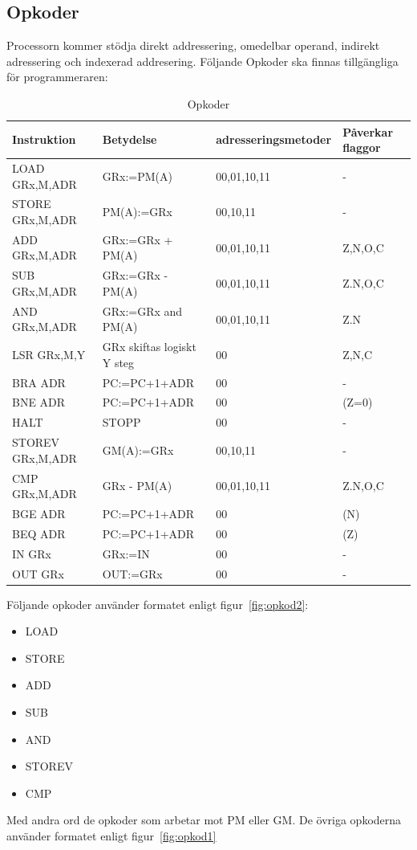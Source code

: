 \subsection{Opkoder}
Processorn kommer stödja direkt addressering, omedelbar operand, indirekt adressering och indexerad addresering.
Följande Opkoder ska finnas tillgängliga för programmeraren:
\begin{table}[H]
  \centering
  \begin{tabular}{|l|l|l|l|}
    \hline
    \textbf{Instruktion} & \textbf{Betydelse} & \textbf{adresseringsmetoder} & \textbf{Påverkar flaggor} \\ \hline
  LOAD GRx,M,ADR & GRx:=PM(A) & 00,01,10,11 & - \\ \hline
   STORE GRx,M,ADR & PM(A):=GRx & 00,10,11 & - \\ \hline
    ADD GRx,M,ADR & GRx:=GRx + PM(A) & 00,01,10,11 & Z,N,O,C \\ \hline
     SUB GRx,M,ADR & GRx:=GRx - PM(A) & 00,01,10,11 & Z.N,O,C \\ \hline
      AND GRx,M,ADR & GRx:=GRx and PM(A) & 00,01,10,11 & Z.N \\ \hline
       LSR GRx,M,Y & GRx skiftas logiskt Y steg & 00 & Z,N,C \\ \hline
        BRA ADR & PC:=PC+1+ADR & 00 & - \\ \hline
         BNE ADR & PC:=PC+1+ADR & 00 & (Z=0) \\ \hline
          HALT  & STOPP & 00 & - \\ \hline
          STOREV GRx,M,ADR & GM(A):=GRx & 00,10,11 & - \\ \hline
     		CMP GRx,M,ADR & GRx - PM(A) & 00,01,10,11 & Z.N,O,C \\ \hline
     		BGE ADR & PC:=PC+1+ADR & 00 & (N) \\ \hline
     		BEQ ADR & PC:=PC+1+ADR & 00 & (Z) \\ \hline
     		IN GRx & GRx:=IN & 00 & - \\ \hline
     		OUT GRx & OUT:=GRx & 00 & - \\ \hline
  \end{tabular}
  \caption{Opkoder}

\end{table}

Följande opkoder använder formatet enligt figur~\ref{fig:opkod2}:
\begin{itemize}
\item LOAD
\item STORE
\item ADD
\item SUB
\item AND
\item STOREV
\item CMP
\end{itemize}
Med andra ord de opkoder som arbetar mot PM eller GM. De övriga opkoderna använder formatet enligt figur~\ref{fig:opkod1}

